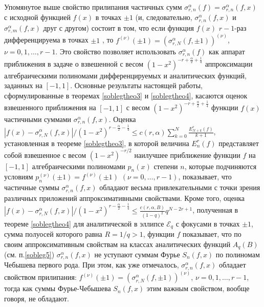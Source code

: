 Упомянутое выше свойство прилипания частичных сумм $\sigma_{r,n}^\alpha(f)=\sigma_{r,n}^\alpha(f,x)$  с исходной функцией $f(x)$ в точках $\pm1$  (и, следовательно, $\sigma_{r,n}^\alpha(f,x)$ и $\sigma_{r,m}^\alpha(f,x)$ друг с другом) состоит в том, что если функция $f(x)$ $r-1$-раз дифференцируема в точках $\pm1$ , то  $f^{(\nu)}(\pm1)=(\sigma_{r,N}^\alpha(f,\pm1))^{(\nu)}$, $\nu=0,1,\ldots, r-1$. Это свойство позволяет использовать $\sigma_{r,n}^\alpha(f)$ как аппарат приближения в задаче о взвешенной с весом $(1-x^2)^{-r+\frac\alpha2+\frac14}$ аппроксимации алгебраическими полиномами дифференцируемых и аналитических функций, заданных на $[-1,1]$. Основные результаты настоящей работы, сформулированные в теоремах \ref{soblegtheo3} и \ref{soblegtheo4}, касаются оценок  взвешенного приближения на $[-1,1]$ с весом $(1-x^2)^{-r+\frac\alpha2+\frac14}$  функции $f(x)$ частичными суммами $\sigma_{r,n}^\alpha(f,x)$. Оценка
$ |f(x)-\sigma_{r,N}^\alpha(f,x)|/(1-x^2)^{r-\frac{\alpha}{2}-\frac14}\le c(r,\alpha)\sum_{k=0}^N\frac{E_{N+k}^r(f)}{k+1}$, установленная в теореме \ref{soblegtheo3}, в которой величина $E_{n}^r(f)$ представляет собой взвешенное с весом $(1-x^2)^{-r/2}$ наилучшее приближение функции $f$ на $[-1,1]$ алгебраическими полиномами $p_n(x)$ степени $n$, которые подчиняются условиям $p_n^{(\nu)}(\pm1)=f^{(\nu)}(\pm1)$ $(\nu=0,\ldots, r-1)$, показывает, что  частичные суммы $\sigma_{r,n}^\alpha(f,x)$ обладают весьма привлекательными с точки зрения различных приложений аппроксимативными свойствами. Кроме того, оценка $|f(x)-\sigma_{r,N}^\alpha(f,x)|/(1-x^2)^{r-\frac{\alpha}{2}-\frac14}\le\frac{c(r,\alpha, B)}{(1-q)^2}q^{N-2r+1}$, полученная в теореме \ref{soblegtheo4} для аналитической в эллипсе $\mathcal{ E}_q$  с фокусами в точках $\pm1$, сумма полуосей которого равна $R=1/q>1$, функции $f$ показывает, что   по своим аппроксимативным свойствам на классах аналитических функций $A_q(B)$ (см. п.\ref{sobleg5}) $\sigma_{r,n}^\alpha(f,x)$ не уступают суммам Фурье $S_n(f,x)$ по полиномам Чебышева первого рода. При этом, как уже отмечалось, $\sigma_{r,n}^\alpha(f,x)$ обладает свойством прилипания:  $f^{(\nu)}(\pm1)=(\sigma_{r,N}^\alpha(f,\pm1))^{(\nu)}$, $\nu=0,1,\ldots, r-1$, тогда как суммы Фурье-Чебышева $S_n(f,x)$ этим важным свойством, вообще говоря, не обладают.

